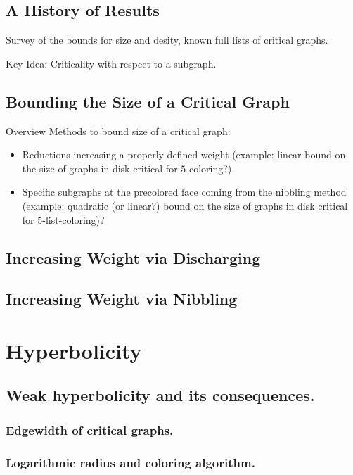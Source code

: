 \documentclass[12pt,twoside,openright,a4paper]{book}
\begin{document}
\section{A History of Results}

Survey of the bounds for size and desity, known full lists of critical graphs.

Key Idea: Criticality with respect to a subgraph.

\section{Bounding the Size of a Critical Graph}

Overview Methods to bound size of a critical graph:
\begin{itemize}
\item Reductions increasing a properly defined weight (example: linear bound on the size of graphs in disk
critical for $5$-coloring?).
\item Specific subgraphs at the precolored face coming from the nibbling method (example: quadratic (or linear?) bound
on the size of graphs in disk critical for $5$-list-coloring)?
\end{itemize}

\section{Increasing Weight via Discharging}

\section{Increasing Weight via Nibbling}

\chapter{Hyperbolicity}


\section{Weak hyperbolicity and its consequences.}

\subsection{Edgewidth of critical graphs. }
\subsection{Logarithmic radius and coloring algorithm.}
\end{document}
